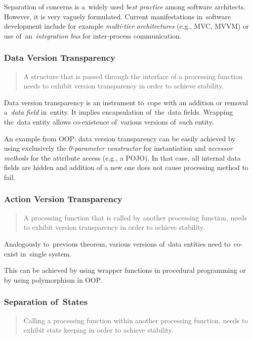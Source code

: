 \documentclass[thesis=M,english,hidelinks]{FITthesis}[2012/10/20]
\begin{document}
Separation of concerns is a~widely used \emph{best practice} among software architects. However, it is very vaguely formulated. Current manifestations in~software development include for example \emph{multi-tier architectures} (e.g., \acrshort{MVC}, \acrshort{MVVM}) or use of~an~\emph{integration bus} for inter-process communication.

\subsubsection{Data Version Transparency}
\begin{quote}
A structure that is passed through the interface of a processing function needs to exhibit version transparency in order to achieve stability.~\cite{ns-toward-general-theory}
\end{quote}

Data version transparency is an instrument to~cope with an addition or removal a~\emph{data field} in~entity. It implies encapsulation of~the~data fields. Wrapping the~data entity allows co-existence of~various versions of~such entity.

An example from \acrshort{OOP}: data version transparency can be easily achieved by using exclusively the \textit{0-parameter constructor} for instantiation and \emph{accessor methods} for the attribute access (e.g., a \acrshort{POJO}). In that case, all internal data fields are hidden and addition of a new one does not cause processing method to fail.

\subsubsection{Action Version Transparency}
\begin{quote}
A processing function that is called by another processing function, needs to exhibit version transparency in order to achieve stability.~\cite{ns-toward-general-theory}
\end{quote}

Analogously to~previous theorem, various versions of~data entities need to~co-exist in~single system.

This can be achieved by using wrapper functions in procedural programming or by using polymorphism in \acrshort{OOP}.

\subsubsection{Separation of~States}
\begin{quote}
Calling a processing function within another processing function, needs to exhibit state keeping in order to achieve stability.~\cite{ns-toward-general-theory}
\end{quote}
\end{document}
